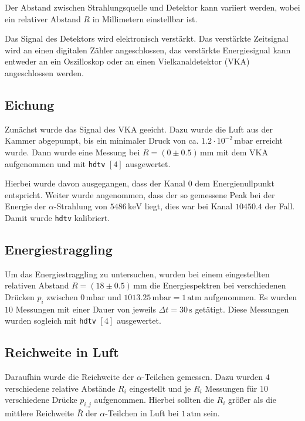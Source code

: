 \documentclass[12pt,a4paper]{scrartcl}
\numberwithin{equation}{section} %
\renewcommand{\[}{} %
\renewcommand{\]}{\noindent} %
\begin{document}
Der Abstand zwischen Strahlungsquelle und Detektor kann variiert werden,
wobei ein relativer Abstand \(R\) in Millimetern einstellbar ist.

Das Signal des Detektors wird elektronisch verstärkt. Das verstärkte
Zeitsignal wird an einen digitalen Zähler angeschlossen, das verstärkte
Energiesignal kann entweder an ein Oszilloskop oder an einen
Vielkanaldetektor (VKA) angeschlossen werden.

\hypertarget{eichung}{%
\subsection{Eichung}\label{eichung}}

Zunächst wurde das Signal des VKA geeicht. Dazu wurde die Luft aus der
Kammer abgepumpt, bis ein minimaler Druck von ca.
\(1.2\cdot10^{-2}\mathrm{\,mbar}\) erreicht wurde. Dann wurde eine
Messung bei \(R=(0\pm0.5)\mathrm{\,mm}\) mit dem VKA aufgenommen und mit
\texttt{hdtv} \([4]\) ausgewertet.

Hierbei wurde davon ausgegangen, dass der Kanal \(0\) dem
Energienullpunkt entspricht. Weiter wurde angenommen, dass der so
gemessene Peak bei der Energie der \(\alpha\)-Strahlung von
\(5486\mathrm{\,keV}\) liegt, dies war bei Kanal \(10450.4\) der Fall.
Damit wurde \texttt{hdtv} kalibriert.

\hypertarget{energiestraggling}{%
\subsection{Energiestraggling}\label{energiestraggling}}

Um das Energiestraggling zu untersuchen, wurden bei einem eingestellten
relativen Abstand \(R=(18\pm 0.5)\mathrm{\,mm}\) die Energiespektren bei
verschiedenen Drücken \(p_i\) zwischen \(0\mathrm{\,mbar}\) und
\(1013.25\mathrm{\,mbar}=1\mathrm{\,atm}\) aufgenommen. Es wurden \(10\)
Messungen mit einer Dauer von jeweils \(\Delta t=30\mathrm{\,s}\)
getätigt. Diese Messungen wurden sogleich mit \texttt{hdtv} \([4]\)
ausgewertet.

\hypertarget{reichweite-in-luft}{%
\subsection{Reichweite in Luft}\label{reichweite-in-luft}}

Daraufhin wurde die Reichweite der \(\alpha\)-Teilchen gemessen. Dazu
wurden \(4\) verschiedene relative Abstände \(R_i\) eingestellt und je
\(R_i\) Messungen für \(10\) verschiedene Drücke \(p_{i,j}\)
aufgenommen. Hierbei sollten die \(R_i\) größer als die mittlere
Reichweite \(\bar R\) der \(\alpha\)-Teilchen in Luft bei
\(1\mathrm{\,atm}\) sein.
\end{document}
